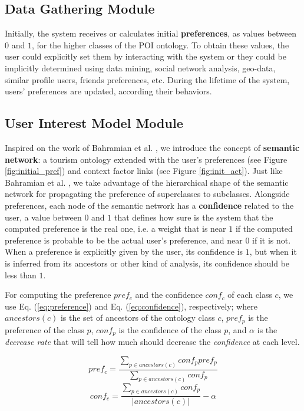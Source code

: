 \subsection{Data Gathering Module}
Initially, the system receives or calculates
initial \textbf{preferences}, as 
values between $0$ and $1$, for the higher classes of the POI ontology. To obtain these values, the user could explicitly set them by interacting with the system or they could be implicitly determined using data mining, social network analysis, geo-data, similar profile users, friends preferences, etc. During the lifetime of the system, users' preferences are updated, according their behaviors. 

\subsection{User Interest Model Module}
Inspired on the work of Bahramian et al. \cite{bahramian_abbaspour_claramunt_2017}, we introduce the concept of \textbf{semantic network}: a tourism ontology extended with the user's preferences (see Figure \ref{fig:initial_pref}) and context factor links
(see Figure \ref{fig:init_act}). Just like Bahramian et al. \cite{bahramian_abbaspour_claramunt_2017}, we take advantage of the hierarchical shape of the semantic network for propagating the preference of superclasses to subclasses. Alongside preferences, each node of the semantic network has a \textbf{confidence} related to the user, a value between $0$ and $1$ that defines how sure is the system that the computed preference is the real one, i.e. a weight that is near $1$ if the computed preference is probable to be the actual user's preference, and near $0$ if it is not. When a preference is explicitly given by the user, its confidence is $1$, but when it is inferred from its ancestors or other kind of analysis, its confidence should be less than $1$. 

For computing the preference $pref_c$ and the confidence $conf_c$ of each class $c$, we use Eq. (\ref{eq:preference}) and Eq. (\ref{eq:confidence}), respectively; where $ancestors(c)$ is the set of ancestors of the ontology class $c$, $pref_p$ is the preference of the class $p$, $conf_p$ is the confidence of the class $p$, and $\alpha$ is the \textit{decrease rate} that will tell how much should decrease the \textit{confidence} at each level. 


\begin{equation} \label{eq:preference}
    pref_c = \frac{\displaystyle \sum_{p \in ancestors(c)}{conf_p pref_p}}
    {\displaystyle  \sum_{p \in ancestors(c)} {conf_p}}
\end{equation}
\begin{equation} \label{eq:confidence}
    conf_c = \frac{\displaystyle \sum_{p \in ancestors(c)} {conf_p}}{|ancestors(c)|} - \alpha
\end{equation}

